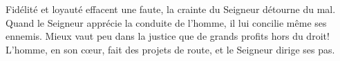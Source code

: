 Fidélité et loyauté effacent une faute,
	la crainte du Seigneur détourne du mal.
Quand le Seigneur apprécie la conduite de l’homme,
	il lui concilie même ses ennemis.
Mieux vaut peu dans la justice
	que de grands profits hors du droit!
L’homme, en son cœur, fait des projets de route,
	et le Seigneur dirige ses pas.
